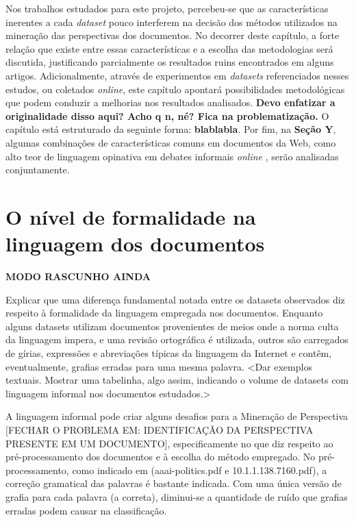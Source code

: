 Nos trabalhos estudados para este projeto, percebeu-se que as características inerentes a cada \emph{dataset} pouco interferem na decisão dos métodos utilizados na mineração das perspectivas dos documentos. No decorrer deste capítulo, a forte relação que existe entre essas características e a escolha das metodologias será discutida, justificando parcialmente os resultados ruins encontrados em alguns artigos. Adicionalmente, através de experimentos em \emph{datasets} referenciados nesses estudos, ou coletados \emph{online}, este capítulo apontará possibilidades metodológicas que podem conduzir a melhorias nos resultados analisados. \textbf{Devo enfatizar a originalidade disso aqui? Acho q n, né? Fica na problematização.} O capítulo está estruturado da seguinte forma: \textbf{blablabla}. Por fim, na \textbf{Seção Y}, algumas combinações de características comuns em documentos da Web, como alto teor de linguagem opinativa em debates informais \emph{online} \cite{somasundaran}, serão analisadas conjuntamente.

\section{O nível de formalidade na linguagem dos documentos}

\textbf{MODO RASCUNHO AINDA}

Explicar que uma diferença fundamental notada entre os datasets observados diz respeito à formalidade da linguagem empregada nos documentos. Enquanto alguns datasets utilizam documentos provenientes de meios onde a norma culta da linguagem impera, e uma revisão ortográfica é utilizada, outros são carregados de gírias, expressões e abreviações típicas da linguagem da Internet e contêm, eventualmente, grafias erradas para uma mesma palavra. <Dar exemplos textuais. Mostrar uma tabelinha, algo assim, indicando o volume de datasets com linguagem informal nos documentos estudados.> 

A linguagem informal pode criar alguns desafios para a Mineração de Perspectiva [FECHAR O PROBLEMA EM: IDENTIFICAÇÃO DA PERSPECTIVA PRESENTE EM UM DOCUMENTO], especificamente no que diz respeito ao pré-processamento dos documentos e à escolha do método empregado. No pré-processamento, como indicado em (aaai-politics.pdf e 10.1.1.138.7160.pdf), a correção gramatical das palavras é bastante indicada. Com uma única versão de grafia para cada palavra (a correta), diminui-se a quantidade de ruído que grafias erradas podem causar na classificação.

